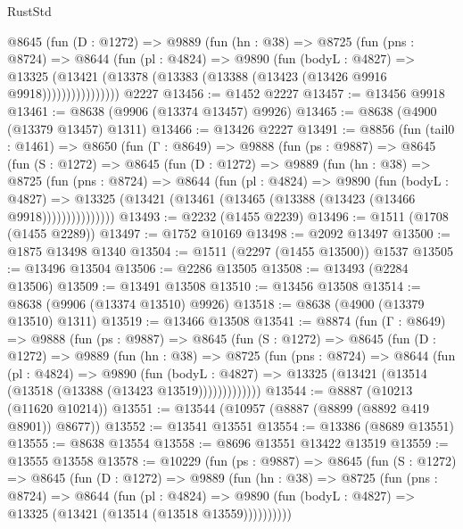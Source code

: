 \begin{lexlean}{RustStd}
\begin{coremodule}
            @8645
              (fun (D : @1272) =>
              @9889
                (fun (hn : @38) =>
                @8725
                  (fun (pns : @8724) =>
                  @8644
                    (fun (pl : @4824) =>
                    @9890
                      (fun (bodyL : @4827) =>
                      @13325
                        (@13421 (@13378 (@13383 (@13388 (@13423 (@13426 @9916 @9918))))))))))))))))
    @2227
@13456 := @1452 @2227
@13457 := @13456 @9918
@13461 := @8638 (@9906 (@13374 @13457) @9926)
@13465 := @8638 (@4900 (@13379 @13457) @1311)
@13466 := @13426 @2227
@13491 := @8856
    (fun (tail0 : @1461) =>
    @8650
      (fun (Γ : @8649) =>
      @9888
        (fun (ps : @9887) =>
        @8645
          (fun (S : @1272) =>
          @8645
            (fun (D : @1272) =>
            @9889
              (fun (hn : @38) =>
              @8725
                (fun (pns : @8724) =>
                @8644
                  (fun (pl : @4824) =>
                  @9890
                    (fun (bodyL : @4827) =>
                    @13325 (@13421 (@13461 (@13465 (@13388 (@13423 (@13466 @9918)))))))))))))))
@13493 := @2232 (@1455 @2239)
@13496 := @1511 (@1708 (@1455 @2289))
@13497 := @1752 @10169
@13498 := @2092 @13497
@13500 := @1875 @13498 @1340
@13504 := @1511 (@2297 (@1455 @13500)) @1537
@13505 := @13496 @13504
@13506 := @2286 @13505
@13508 := @13493 (@2284 @13506)
@13509 := @13491 @13508
@13510 := @13456 @13508
@13514 := @8638 (@9906 (@13374 @13510) @9926)
@13518 := @8638 (@4900 (@13379 @13510) @1311)
@13519 := @13466 @13508
@13541 := @8874
    (fun (Γ : @8649) =>
    @9888
      (fun (ps : @9887) =>
      @8645
        (fun (S : @1272) =>
        @8645
          (fun (D : @1272) =>
          @9889
            (fun (hn : @38) =>
            @8725
              (fun (pns : @8724) =>
              @8644
                (fun (pl : @4824) =>
                @9890
                  (fun (bodyL : @4827) =>
                  @13325 (@13421 (@13514 (@13518 (@13388 (@13423 @13519)))))))))))))
@13544 := @8887 (@10213 (@11620 @10214))
@13551 := @13544 (@10957 (@8887 (@8899 (@8892 @419 @8901)) @8677))
@13552 := @13541 @13551
@13554 := @13386 (@8689 @13551)
@13555 := @8638 @13554
@13558 := @8696 @13551 @13422 @13519
@13559 := @13555 @13558
@13578 := @10229
    (fun (ps : @9887) =>
    @8645
      (fun (S : @1272) =>
      @8645
        (fun (D : @1272) =>
        @9889
          (fun (hn : @38) =>
          @8725
            (fun (pns : @8724) =>
            @8644
              (fun (pl : @4824) =>
              @9890 (fun (bodyL : @4827) => @13325 (@13421 (@13514 (@13518 @13559))))))))))

\end{coremodule}
\end{lexlean}
